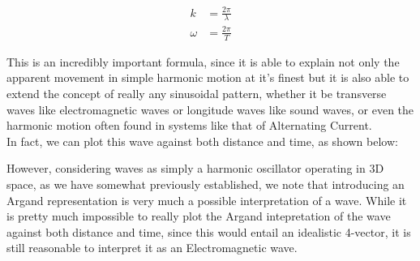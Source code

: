 \documentclass[a4paper,12pt,oneside]{book}
\begin{document}
\begin{align*}
    k &= \frac{2\pi}{\lambda} \\
    \omega &= \frac{2\pi}{T}
\end{align*}

This is an incredibly important formula, since it is able to explain not only the apparent movement in simple harmonic motion at it's finest but it is also able to extend the concept of really any sinusoidal pattern, whether it be transverse waves like electromagnetic waves or longitude waves like sound waves, or even the harmonic motion often found in systems like that of Alternating Current. \\

 \newpage
In fact, we can plot this wave against both distance and time, as shown below:

\begin{center}
\end{center}

However, considering waves as simply a harmonic oscillator operating in 3D space, as we have somewhat previously established, we note that introducing an Argand representation is very much a possible interpretation of a wave. While it is pretty much impossible to really plot the Argand intepretation of the wave against both distance and time, since this would entail an idealistic 4-vector, it is still reasonable to interpret it as an Electromagnetic wave. \\
\end{document}

